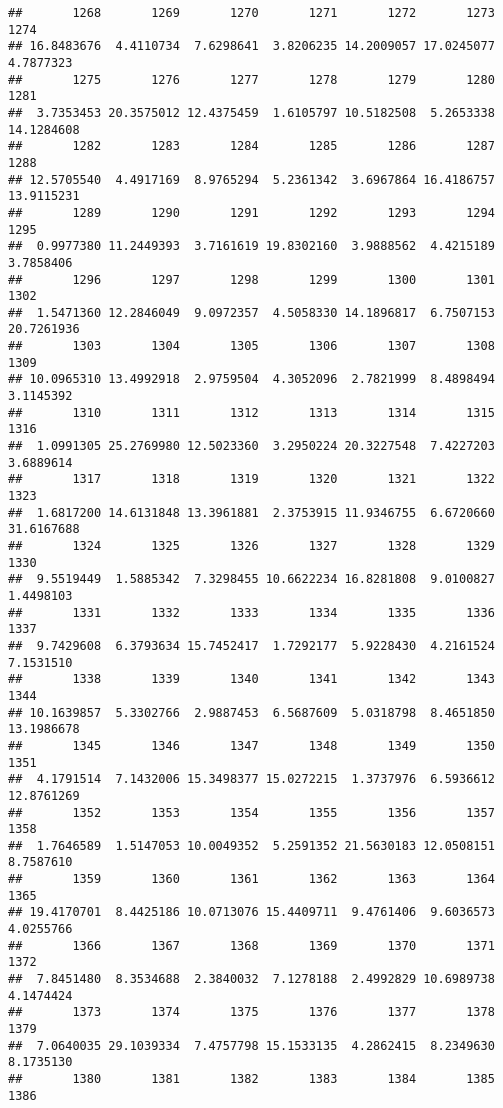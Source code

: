 \documentclass[
]{article}
\begin{document}
\begin{verbatim}
##       1268       1269       1270       1271       1272       1273       1274 
## 16.8483676  4.4110734  7.6298641  3.8206235 14.2009057 17.0245077  4.7877323 
##       1275       1276       1277       1278       1279       1280       1281 
##  3.7353453 20.3575012 12.4375459  1.6105797 10.5182508  5.2653338 14.1284608 
##       1282       1283       1284       1285       1286       1287       1288 
## 12.5705540  4.4917169  8.9765294  5.2361342  3.6967864 16.4186757 13.9115231 
##       1289       1290       1291       1292       1293       1294       1295 
##  0.9977380 11.2449393  3.7161619 19.8302160  3.9888562  4.4215189  3.7858406 
##       1296       1297       1298       1299       1300       1301       1302 
##  1.5471360 12.2846049  9.0972357  4.5058330 14.1896817  6.7507153 20.7261936 
##       1303       1304       1305       1306       1307       1308       1309 
## 10.0965310 13.4992918  2.9759504  4.3052096  2.7821999  8.4898494  3.1145392 
##       1310       1311       1312       1313       1314       1315       1316 
##  1.0991305 25.2769980 12.5023360  3.2950224 20.3227548  7.4227203  3.6889614 
##       1317       1318       1319       1320       1321       1322       1323 
##  1.6817200 14.6131848 13.3961881  2.3753915 11.9346755  6.6720660 31.6167688 
##       1324       1325       1326       1327       1328       1329       1330 
##  9.5519449  1.5885342  7.3298455 10.6622234 16.8281808  9.0100827  1.4498103 
##       1331       1332       1333       1334       1335       1336       1337 
##  9.7429608  6.3793634 15.7452417  1.7292177  5.9228430  4.2161524  7.1531510 
##       1338       1339       1340       1341       1342       1343       1344 
## 10.1639857  5.3302766  2.9887453  6.5687609  5.0318798  8.4651850 13.1986678 
##       1345       1346       1347       1348       1349       1350       1351 
##  4.1791514  7.1432006 15.3498377 15.0272215  1.3737976  6.5936612 12.8761269 
##       1352       1353       1354       1355       1356       1357       1358 
##  1.7646589  1.5147053 10.0049352  5.2591352 21.5630183 12.0508151  8.7587610 
##       1359       1360       1361       1362       1363       1364       1365 
## 19.4170701  8.4425186 10.0713076 15.4409711  9.4761406  9.6036573  4.0255766 
##       1366       1367       1368       1369       1370       1371       1372 
##  7.8451480  8.3534688  2.3840032  7.1278188  2.4992829 10.6989738  4.1474424 
##       1373       1374       1375       1376       1377       1378       1379 
##  7.0640035 29.1039334  7.4757798 15.1533135  4.2862415  8.2349630  8.1735130 
##       1380       1381       1382       1383       1384       1385       1386 

\end{verbatim}
\end{document}
